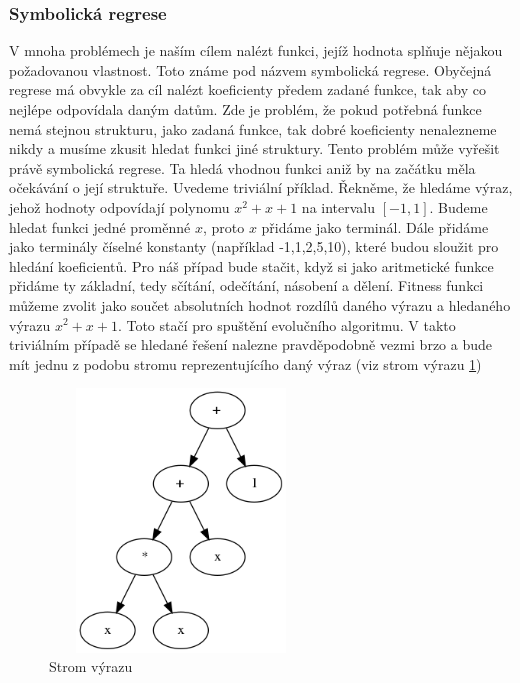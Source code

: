 \subsubsection{Symbolická regrese}
V mnoha problémech je naším cílem nalézt funkci, jejíž hodnota splňuje nějakou požadovanou vlastnost. Toto známe pod názvem symbolická regrese.
Obyčejná regrese má obvykle za cíl nalézt koeficienty předem zadané funkce, tak aby co nejlépe odpovídala daným datům.
Zde je problém, že pokud potřebná funkce nemá stejnou strukturu, jako zadaná funkce, tak dobré koeficienty nenalezneme nikdy a musíme zkusit hledat funkci jiné struktury.
Tento problém může vyřešit právě symbolická regrese. Ta hledá vhodnou funkci aniž by na začátku měla očekávání o její struktuře.
Uvedeme triviální příklad. Řekněme, že hledáme výraz, jehož hodnoty odpovídají polynomu $x^2+x+1$ na intervalu $[-1,1]$.
Budeme hledat funkci jedné proměnné $x$, proto $x$ přidáme jako terminál. Dále přidáme jako terminály číselné konstanty (například -1,1,2,5,10), které budou sloužit pro hledání koeficientů.
Pro náš případ bude stačit, když si jako aritmetické funkce přidáme ty základní, tedy sčítání, odečítání, násobení a dělení.
Fitness funkci můžeme zvolit jako součet absolutních hodnot rozdílů daného výrazu a hledaného výrazu $x^2+x+1$.
Toto stačí pro spuštění evolučního algoritmu. 
V takto triviálním případě se hledané řešení nalezne pravděpodobně vezmi brzo a bude mít jednu z podobu stromu reprezentujícího daný výraz (viz strom výrazu \ref{obr04:GrafFormule})


\begin{figure}[p]\centering
\includegraphics[width=70mm, height=70mm]{./Obrazky/formule_graph_2.png}
\caption{Strom výrazu}
\label{obr04:GrafFormule}
\end{figure}




